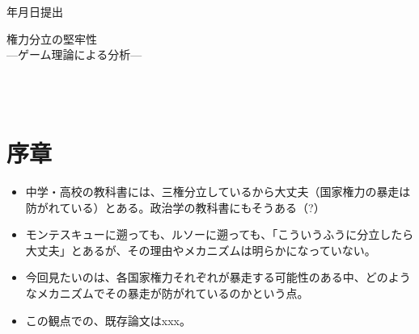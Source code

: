 \documentclass[uplatex,a4j,11pt]{jsarticle}
\theoremstyle{roman}
\begin{document}
\newcommand{\kyo}{{\number\year}年{\number\month}月{\number\day}日}
\newcommand{\提出日}{\kyo}
\newcommand{\題目}{権力分立の堅牢性}
\newcommand{\副題}{ゲーム理論による分析}
\newcommand{\学番}{1762247E}
\newcommand{\氏名}{山本　燿司}
\thispagestyle{empty}
\begin{flushright}
{\Large \提出日 提出}\\[0.2\textheight]
\end{flushright}
\begin{center}
{\Large \hspace{1zw}\Huge \題目}\\[\baselineskip]
{\Large \——\副題\——} %
\end{center}
\vfill

\begin{flushleft}
\hspace{25zw}{\Large 宮川栄一研究室}\\[1zh]
\hspace{25zw}{\Large 学籍番号\ \学番}\\[1zh]
\hspace{25zw}{\Large 氏名\hspace{0.5zw}\氏名}
\end{flushleft}
\clearpage

\thispagestyle{empty}
\tableofcontents
\thispagestyle{empty}
\clearpage

\section*{序章}
\setcounter{page}{1}

\begin{itemize}
  \item 中学・高校の教科書には、三権分立しているから大丈夫（国家権力の暴走は防がれている）とある。政治学の教科書にもそうある（?）
  \item モンテスキューに遡っても、ルソーに遡っても、「こういうふうに分立したら大丈夫」とあるが、その理由やメカニズムは明らかになっていない。
  \item 今回見たいのは、各国家権力それぞれが暴走する可能性のある中、どのようなメカニズムでその暴走が防がれているのかという点。
  \item この観点での、既存論文はxxx。
\end{itemize}
\end{document}
